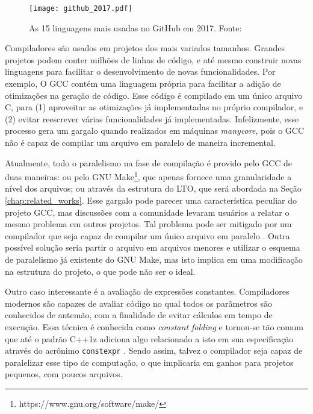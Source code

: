 \begin{figure}[ht]
 \centering
 \texttt{[image: github\_2017.pdf]}
 \caption{As 15 linguagens mais usadas no GitHub em 2017. Fonte: \cite{githuboctoverse}}
 \label{fig:github_2017}
\end{figure}

Compiladores são usados em projetos dos mais variados tamanhos.%
Grandes projetos podem conter milhões de linhas de código, e até mesmo
construir novas linguagens para facilitar o desenvolvimento de novas
funcionalidades.
Por exemplo, O GCC contém uma linguagem própria para facilitar
a adição de otimizações na geração de código. Esse código é
compilado em um único arquivo C, para (1) aproveitar as otimizações já
implementadas no próprio compilador, e (2) evitar reescrever várias
funcionalidades já implementadas. Infelizmente, esse processo gera um gargalo
quando realizados em máquinas \textit{manycore}, pois o GCC não é capaz de
compilar um arquivo em paralelo de maneira incremental.

Atualmente, todo o paralelismo na fase de compilação é provido pelo GCC de duas
maneiras: ou pelo GNU Make\footnote{https://www.gnu.org/software/make/}, que apenas
fornece uma granularidade a nível dos arquivos; ou através da estrutura do LTO,
que será abordada na Seção \ref{chap:related_works}. Esse gargalo pode parecer uma
característica peculiar do projeto GCC, mas discussões com a comunidade levaram
usuários a relatar o mesmo problema em outros projetos. Tal problema pode ser mitigado por um compilador
que seja capaz de compilar um único arquivo em paralelo\citep{mailgcc} \citep{phoronix}.
Outra possível solução seria partir o arquivo em arquivos menores e utilizar o esquema de
paralelismo já existente do GNU Make, mas isto implica em uma modificação na
estrutura do projeto, o que pode não ser o ideal.

Outro caso interessante é a avaliação de expressões constantes. Compiladores
modernos são capazes de avaliar código no qual todos os parâmetros são conhecidos
de antemão, com a finalidade de evitar cálculos em tempo de execução. Essa
técnica é conhecida como \textit{constant folding} \citep{dragonbook} e
tornou-se tão comum que até o padrão C++1z adiciona algo relacionado a isto em
sua especificação através do acrônimo \texttt{constexpr} \citep{iso148822017}.
Sendo assim, talvez o compilador seja capaz de paralelizar esse tipo de
computação, o que implicaria em ganhos para projetos pequenos, com poucos
arquivos.

